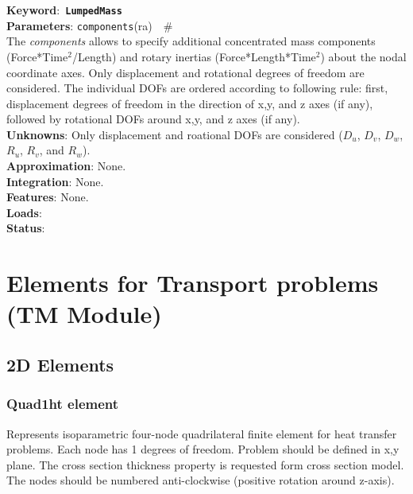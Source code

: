 \documentclass[a4paper]{article}
\newcommand{\descitem}[1]{{\noindent \bf #1}:}
\newcommand{\elemkeyword}[1]{\descitem{Keyword}~{\bf \texttt{#1}}}
\newcommand{\elemparam}[2]{{{\texttt{#1}\tiny (#2)}~~\#}}
\newcommand{\param}[1]{{\em #1}}
\begin{document}
\elemkeyword{LumpedMass}\\
\descitem{Parameters} \elemparam{components}{ra}\\
The \param{components} allows to specify additional concentrated mass components (Force*Time$^2$/Length) and rotary inertias (Force*Length*Time$^2$) about the nodal coordinate axes. Only displacement and rotational degrees of freedom are considered. The individual DOFs are ordered according to following rule: first, displacement degrees of freedom in the direction of x,y, and z axes (if any), followed by rotational DOFs around x,y, and z axes (if any).\\
\descitem{Unknowns}
Only displacement and roational DOFs are considered ($D_u$, $D_v$, $D_w$, $R_u$, $R_v$, and $R_w$).\\
\descitem{Approximation} None.\\
\descitem{Integration}
None.\\
\descitem{Features} None.\\
\descitem{Loads} \\
\descitem{Status} 


\section{Elements for Transport problems\\(TM Module)}
\subsection{2D Elements}
\subsubsection{Quad1ht element}
\label{Quad1ht}
Represents isoparametric four-node quadrilateral finite element for
heat transfer problems. Each node has 1 degrees of freedom.
Problem should be defined in x,y plane. The cross section thickness
property is requested form cross section model.
The nodes should be numbered anti-clockwise (positive rotation around
z-axis). 
\end{document}
